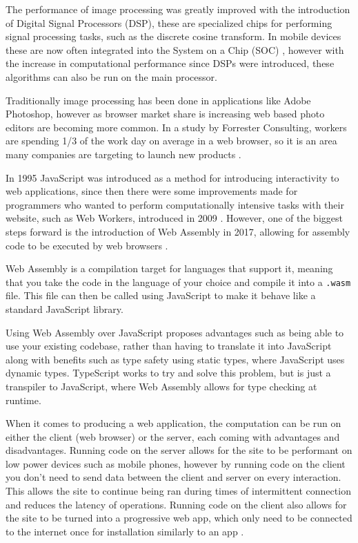 \documentclass[12pt,a4paper]{article}
\begin{document}
The performance of image processing was greatly improved with the introduction of Digital Signal Processors (DSP), these are specialized chips for performing signal processing tasks, such as the discrete cosine transform. In mobile devices these are now often integrated into the System on a Chip (SOC) \cite{angoletta2008digital}, however with the increase in computational performance since DSPs were introduced, these algorithms can also be run on the main processor.

Traditionally image processing has been done in applications like Adobe Photoshop, however as browser market share is increasing web based photo editors are becoming more common. In a study by Forrester Consulting, workers are spending 1/3 of the work day on average in a web browser, so it is an area many companies are targeting to launch new products \cite{cloud_worker}.


In 1995 JavaScript was introduced as a method for introducing interactivity to web applications, since then there were some improvements made for programmers who wanted to perform computationally intensive tasks with their website, such as Web Workers, introduced in 2009 \cite{Hickson}. However, one of the biggest steps forward is the introduction of Web Assembly in 2017, allowing for assembly code to be executed by web browsers \cite{haas2017bringing}.

Web Assembly is a compilation target for languages that support it, meaning that you take the code in the language of your choice and compile it into a \texttt{.wasm} file. This file can then be called using JavaScript to make it behave like a standard JavaScript library.

Using Web Assembly over JavaScript proposes advantages such as being able to use your existing codebase, rather than having to translate it into JavaScript along with benefits such as type safety using static types, where JavaScript uses dynamic types. TypeScript works to try and solve this problem, but is just a transpiler to JavaScript, where Web Assembly allows for type checking at runtime.

When it comes to producing a web application, the computation can be run on either the client (web browser) or the server, each coming with advantages and disadvantages. Running code on the server allows for the site to be performant on low power devices such as mobile phones, however by running code on the client you don't need to send data between the client and server on every interaction. This allows the site to continue being ran during times of intermittent connection and reduces the latency of operations. Running code on the client also allows for the site to be turned into a progressive web app, which only need to be connected to the internet once for installation similarly to an app \cite{biorn2017progressive}.
\end{document}
